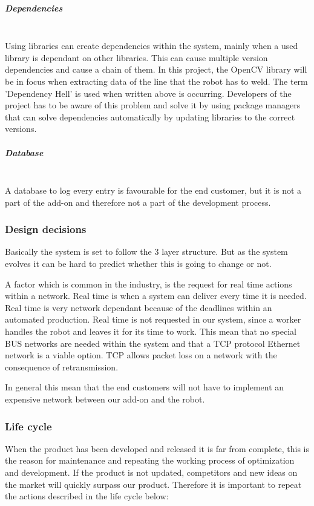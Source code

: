 \subparagraph*{Dependencies}~\\
Using libraries can create dependencies within the system, mainly when a used library is dependant on other libraries. This can cause multiple version dependencies and cause a chain of them. In this project, the OpenCV library will be in focus when extracting data of the line that the robot has to weld. The term 'Dependency Hell' is used when written above is occurring. Developers of the project has to be aware of this problem and solve it by using package managers that can solve dependencies automatically by updating libraries to the correct versions. 

\subparagraph*{Database}~\\
A database to log every entry is favourable for the end customer, but it is not a part of the add-on and therefore not a part of the development process.

\subsubsection{Design decisions}
Basically the system is set to follow the 3 layer structure. But as the system evolves it can be hard to predict whether this is going to change or not. 

A factor which is common in the industry, is the request for real time actions within a network. Real time is when a system can deliver every time it is needed. Real time is very network dependant because of the deadlines within an automated production. 
Real time is not requested in our system, since a worker handles the robot and leaves it for its time to work. This mean that no special BUS networks are needed within the system and that a TCP protocol Ethernet network is a viable option. TCP allows packet loss on a network with the consequence of retransmission.

In general this mean that the end customers will not have to implement an expensive network between our add-on and the robot. 

\subsubsection{Life cycle}

When the product has been developed and released it is far from complete, this is the reason for maintenance and repeating the working process of optimization and development. If the product is not updated, competitors and new ideas on the market will quickly surpass our product. Therefore it is important to repeat the actions described in the life cycle below:
\clearpage

